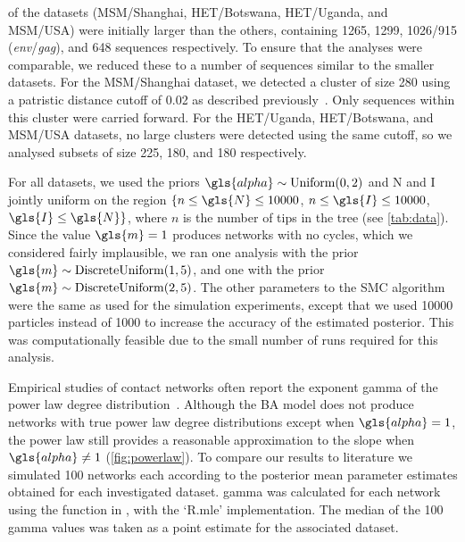   of the datasets (MSM/Shanghai, HET/Botswana, HET/Uganda, 
and MSM/USA) were initially larger than the others, containing 1265, 1299,
1026/915 (\textit{env}/\textit{gag}), and 648 sequences respectively. To ensure
that the analyses were comparable, we reduced these to a number of sequences
similar to the smaller datasets. For the MSM/Shanghai dataset, we detected a
cluster of size 280 using a patristic distance cutoff of 0.02 as described
previously~\autocite{poon2015impact}. Only sequences within this cluster were
carried forward. For the HET/Uganda, HET/Botswana, and MSM/USA datasets, no
large clusters were detected using the same cutoff, so we analysed subsets of
size 225, 180, and 180 respectively. 

For all datasets, we used the priors $\gls{alpha} \sim \Uniform(0, 2)$ and
\gls{N} and \gls{I} jointly uniform on the region $\{n \leq \gls{N} \leq
10000$, $n \leq \gls{I} \leq 10000$, $\gls{I} \leq \gls{N}\}$, where $n$ is the
number of tips in the tree (see \cref{tab:data}). Since the value $\gls{m} = 1$
produces networks with no cycles, which we considered fairly implausible, we
ran one analysis with the prior $\gls{m} \sim \DiscreteUniform(1, 5)$, and one
with the prior $\gls{m} \sim \DiscreteUniform(2, 5)$. The other parameters to
the SMC algorithm were the same as used for the simulation experiments, except
that we used 10000 particles instead of 1000 to increase the accuracy of the
estimated posterior. This was computationally feasible due to the small number
of runs required for this analysis.


Empirical studies of contact networks often report the exponent \gls{gamma} of
the power law degree distribution~\autocite{colgate1989risk, liljeros2001web,
schneeberger2004scale, clemenccon2015statistical, rothenberg2007large,
brown2011transmission}. Although the \gls{BA} model does not produce networks
with true power law degree distributions except when $\gls{alpha} = 1$, the
power law still provides a reasonable approximation to the slope when
$\gls{alpha} \neq 1$ (\cref{fig:powerlaw}).  To compare our results to
 literature we simulated 100 networks each according to
the posterior mean parameter estimates obtained for each investigated dataset.
\gls{gamma} was calculated for each network using the
 function in , with the `R.mle'
implementation. The median of the 100 \gls{gamma} values was taken as a point
estimate for the associated dataset.

